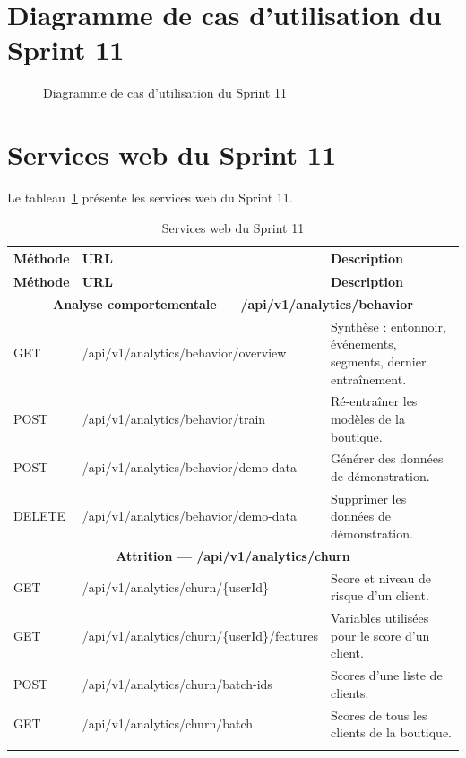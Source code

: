 \section{Diagramme de cas d'utilisation du Sprint 11}
\begin{figure}[H]
    \centering
    \caption{Diagramme de cas d'utilisation du Sprint 11}
    \label{fig:cu-sprint11}
\end{figure}

\section{Services web du Sprint 11}
Le tableau~\ref{tab:ws-sprint11} présente les services web du Sprint 11.
\renewcommand{\arraystretch}{1.15}
\setlength{\tabcolsep}{4pt}
\begin{longtable}{|p{1.7cm}|p{8.8cm}|p{4.2cm}|}
\hline
\textbf{Méthode} & \textbf{URL} & \textbf{Description} \\
\hline
\endfirsthead
\hline
\textbf{Méthode} & \textbf{URL} & \textbf{Description} \\
\hline
\endhead
\multicolumn{3}{|c|}{\textbf{Analyse comportementale --- /api/v1/analytics/behavior}} \\
\hline
GET & /api/v1/analytics/behavior/overview & Synthèse : entonnoir, événements, segments, dernier entraînement. \\
\hline
POST & /api/v1/analytics/behavior/train & Ré-entraîner les modèles de la boutique. \\
\hline
POST & /api/v1/analytics/behavior/demo-data & Générer des données de démonstration. \\
\hline
DELETE & /api/v1/analytics/behavior/demo-data & Supprimer les données de démonstration. \\
\hline
\multicolumn{3}{|c|}{\textbf{Attrition --- /api/v1/analytics/churn}} \\
\hline
GET & /api/v1/analytics/churn/\{userId\} & Score et niveau de risque d'un client. \\
\hline
GET & /api/v1/analytics/churn/\{userId\}/features & Variables utilisées pour le score d'un client. \\
\hline
POST & /api/v1/analytics/churn/batch-ids & Scores d'une liste de clients. \\
\hline
GET & /api/v1/analytics/churn/batch & Scores de tous les clients de la boutique. \\
\hline
\caption{Services web du Sprint 11}
\label{tab:ws-sprint11}
\end{longtable}

